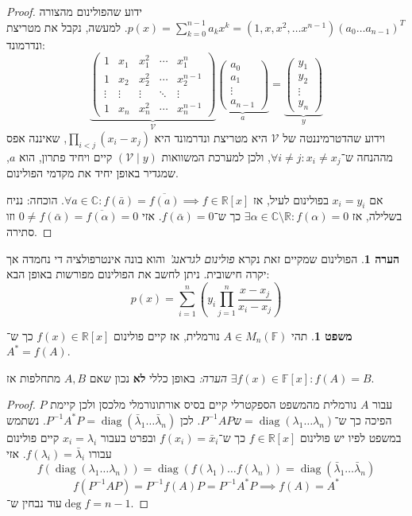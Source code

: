 \documentclass[a4paper]{article}
\newcommand\R     {\mathbb{R}}
\newcommand\C     {\mathbb{C}}
\newcommand\vc    {\mathcal{V}} %
\newcommand\ol    {\overline}
\DeclareMathOperator{\diag}    {diag}
\newcommand\F         {\mathbb{F}}
\newcommand\co        {\colon}
\newcommand\pms[1]    {\begin{pmatrix}
		#1
\end{pmatrix}}
\newcommand\ag        {\alpha}
\renewcommand\lg      {\lambda}
\newcommand\op    {^{-1}}
\newcommand\cl [1]    {\left ( #1 \right )}
\theoremstyle{definition}
\newtheorem{Theorem}{\color{myblue}משפט}
\newtheorem{Remark}{\color{mycyan}הערה}
\newcommand\theo  [1] {\begin{Theorem}#1\end{Theorem}}
\newcommand\rmark [1] {\begin{Remark}#1\end{Remark}}
\begin{document}
	\begin{proof}
		ידוע שהפולינום מהצורה $p(x)  = \sum_{k = 0}^{n - 1} a_k x^k  = (1, x, x^2, \dots x^{n - 1}) (a_0 \dots a_{n - 1})^T$. למעשה, נקבל את מטריצת ונדרמונד: 
		\[ \underbrace{\pms{1 & x_1 & x_1^2 & \cdots & x_1^n \\ 1 & x_2 & x_2^2 & \cdots & x_2^{n - 1} \\ \vdots & \vdots & \vdots & \ddots & \vdots \\ 1 & x_n & x_n^2 & \cdots & x_n^{n - 1}}}_{\vc}\underbrace{\pms{a_0 \\ a_1 \\ \vdots \\ a_{n - 1}}}_{a} = \underbrace{\pms{y_1 \\ y_2 \\ \vdots \\ y_n}}_{y} \]
		וידוע שהדטרמיננטה של $\vc$ היא מטריצת ונדרמונד היא $\prod_{i < j} (x_i - x_j)$, שאיננה אפס מההנחה ש־$\forall i \neq j \co x_i \neq x_j$, ולכן למערכת המשוואות $(\vc \mid y)$ קיים ויחיד פתרון, הוא $a$, שמגדיר באופן יחיד את מקדמי הפולינום. 
		
		אם $x_i = y_i$ בפולינום לעיל, אז $\forall a \in \C \co f(\bar a) = \ol{f(a)} \implies f \in \R[x]$. הוכחה: נניח בשלילה, אז $\exists \ag \in \C\setminus \R \co f(\ag) = 0$ כך ש־$f(\bar \ag) = 0$. אזי $0 \neq f(\bar \ag) = \ol{f(\ag)}  = 0$ וזו סתירה. 
	\end{proof}
	
	\rmark{הפולינום שמקיים זאת נקרא \textit{פולינום לגראנג'} והוא בונה אינטרפולציה די נחמדה אך יקרה חישובית. ניתן לחשב את הפולינום מפורשות באופן הבא: 
	\[ p(x) = \sum_{i = 1}^{n}\cl{y_i \prod_{j = 1}^{n}\frac{x - x_j}{x_i - x_j}} \]}
	
	\theo{תהי $A \in M_n(\F)$ נורמלית, אז קיים פולינום $f(x) \in \R[x]$ כך ש־$A^* = f(A)$. }
	\textit{הערה: }באופן כללי \textbf{לא} נכון שאם $A, B$ מתחלפות אז $\exists f(x) \in \F[x] \co f(A) = B$. 
	\begin{proof}
		עבור $A$ נורמלית מהמשפט הספקטרלי קיים בסיס אורתונורמלי מלכסן ולכן קיימת $P$ הפיכה כך ש־$P\op APש = \diag(\lg_1 \dots \lg_n)$. לכן $P\op A^* P = \diag(\bar \lg_1 \dots \bar \lg_n)$. נשתמש במשפט לפיו יש פולינום $f \in \R[x]$ כך ש־$f(x_i) = \bar x_i$ ובפרט בעבור $x_i = \lg_i$ קיים פולינום עבורו $f(\lg_i) = \bar \lg_i$. אזי 
		\[ f(\diag(\lg_1 \dots \lg_n)) = \diag(f(\lg_1) \dots f(\lg_n)) = \diag(\bar \lg_1 \dots \bar \lg_n) \]
		\[ f(P\op A P) = P\op f(A) P = P \op A^* P \implies f(A) = A^* \]
		עוד נבחין ש־$\deg f = n - 1$. 
	\end{proof}
	
\end{document}
